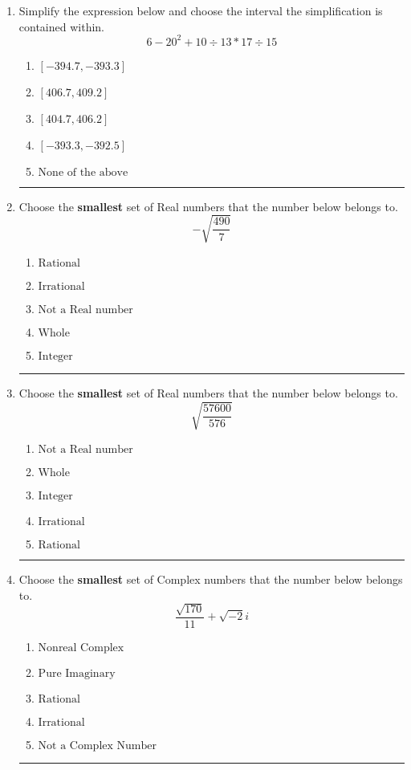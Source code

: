 \documentclass[14pt]{extbook}
\newcommand{\litem}[1]{\item#1\hspace*{-1cm}\rule{\textwidth}{0.4pt}}
\begin{document}
\begin{enumerate}
\litem{
Simplify the expression below and choose the interval the simplification is contained within.\[ 6 - 20^2 + 10 \div 13 * 17 \div 15 \]\begin{enumerate}[label=\Alph*.]
\item \( [-394.7, -393.3] \)
\item \( [406.7, 409.2] \)
\item \( [404.7, 406.2] \)
\item \( [-393.3, -392.5] \)
\item \( \text{None of the above} \)

\end{enumerate} }
\litem{
Choose the \textbf{smallest} set of Real numbers that the number below belongs to.\[ -\sqrt{\frac{490}{7}} \]\begin{enumerate}[label=\Alph*.]
\item \( \text{Rational} \)
\item \( \text{Irrational} \)
\item \( \text{Not a Real number} \)
\item \( \text{Whole} \)
\item \( \text{Integer} \)

\end{enumerate} }
\litem{
Choose the \textbf{smallest} set of Real numbers that the number below belongs to.\[ \sqrt{\frac{57600}{576}} \]\begin{enumerate}[label=\Alph*.]
\item \( \text{Not a Real number} \)
\item \( \text{Whole} \)
\item \( \text{Integer} \)
\item \( \text{Irrational} \)
\item \( \text{Rational} \)

\end{enumerate} }
\litem{
Choose the \textbf{smallest} set of Complex numbers that the number below belongs to.\[ \frac{\sqrt{170}}{11}+\sqrt{-2}i \]\begin{enumerate}[label=\Alph*.]
\item \( \text{Nonreal Complex} \)
\item \( \text{Pure Imaginary} \)
\item \( \text{Rational} \)
\item \( \text{Irrational} \)
\item \( \text{Not a Complex Number} \)


\end{enumerate}}
\end{enumerate}
\end{document}
